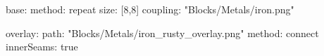 base:
  method: repeat
  size: [8,8]
  coupling: "Blocks/Metals/iron.png"
  
overlay:
  path: "Blocks/Metals/iron_rusty_overlay.png"
  method: connect
  innerSeams: true